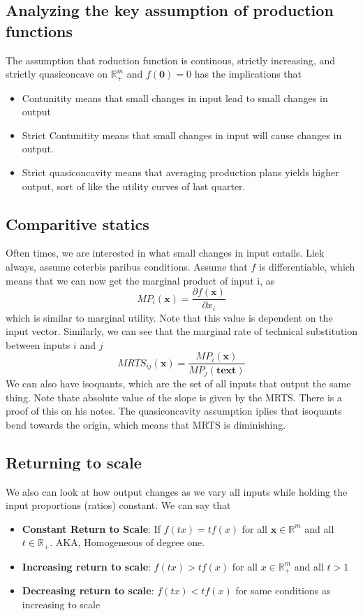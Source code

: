 \documentclass[12pt]{article}
\newcommand{\R}{\mathbb{R}}
\begin{document}
\subsection{Analyzing the key assumption of production functions}
The assumption that roduction function is continous, strictly increasing, and strictly quasiconcave on $\R_+^m$ and $f(\mathbf{0}) = 0$ has the implications that 
\begin{itemize}
    \item Contunitity means that small changes in input lead to small changes in output
    \item Strict Contunitity means that small changes in input will cause changes in output. 
    \item Strict quasiconcavity means that averaging production plans yields higher output, sort of like the utility curves of last quarter.
\end{itemize}
\subsection{Comparitive statics}
Often times, we are interested in what small changes in input entails. Liek always, assume ceterbis paribus conditions. Assume that $f$ is differentiable, which means that we can now get the marginal product of input i, as 
\[
MP_i(\mathbf{x}) = \frac{\partial f(\mathbf{x})}{\partial x_i}
\]
which is similar to marginal utility. Note that this value is dependent on the input vector. Similarly, we can see that the marginal rate of technical substitution between inputs $i$ and $j$
\[
MRTS_{ij}(\mathbf{x}) = \frac{MP_i(\mathbf{x})}{MP_j(\mathbf{text})}
\]
We can also have isoquants, which are the set of all inputs that output the same thing. Note thate absolute value of the slope is given by the MRTS. There is a proof of this on his notes. The quasiconcavity assumption iplies that isoquants bend towards the origin, which means that MRTS is diminishing. 
\subsection{Returning to scale}
We also can look at how output changes as we vary all inputs while holding the input proportions (ratios) constant. We can say that 
\begin{itemize}
    \item \textbf{Constant Return to Scale}: If $f(tx) = tf(x)$ for all $\mathbf{x} \in \R^m$ and all $t \in \R_+$. AKA, Homogeneous of degree one. 
    \item \textbf{Increasing return to scale}: $f(tx) > tf(x)$ for all $x \in \R^m_+$ and all $t > 1$
    \item \textbf{Decreasing return to scale}: $f(tx) < tf(x)$ for same conditions as increasing to scale
\end{itemize}
\end{document}
